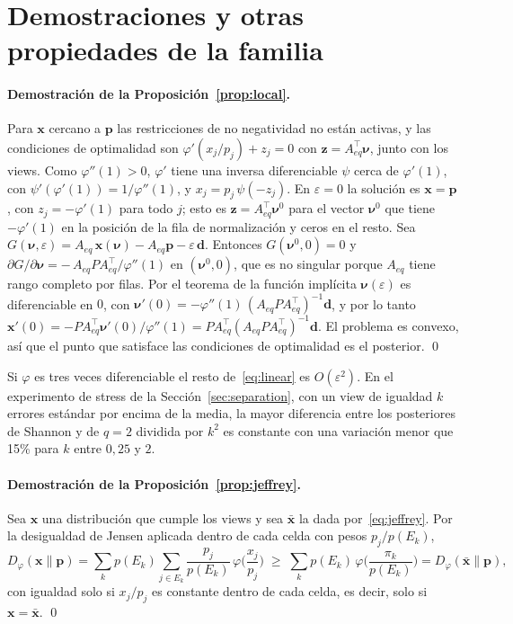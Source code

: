 \documentclass[11pt]{article}
\newcommand{\p}{\mathbf{p}}
\newcommand{\x}{\mathbf{x}}
\begin{document}
\section{Demostraciones y otras propiedades de la familia}\label{app:proofs}

\paragraph{Demostraci\'on de la Proposici\'on~\ref{prop:local}.} Para $\x$
cercano a $\p$ las restricciones de no negatividad no est\'an activas, y las
condiciones de optimalidad son $\varphi'(x_j/p_j) + z_j = 0$ con
$\mathbf{z} = A_{eq}^\top \boldsymbol{\nu}$, junto con los views. Como
$\varphi''(1) > 0$, $\varphi'$ tiene una inversa diferenciable $\psi$ cerca
de $\varphi'(1)$, con $\psi'(\varphi'(1)) = 1/\varphi''(1)$, y
$x_j = p_j\,\psi(-z_j)$. En $\varepsilon = 0$ la soluci\'on es $\x = \p$,
con $z_j = -\varphi'(1)$ para todo $j$; esto es
$\mathbf{z} = A_{eq}^\top \boldsymbol{\nu}^0$ para el vector
$\boldsymbol{\nu}^0$ que tiene $-\varphi'(1)$ en la posici\'on de la fila de
normalizaci\'on y ceros en el resto. Sea
$G(\boldsymbol{\nu}, \varepsilon) = A_{eq}\,\x(\boldsymbol{\nu}) -
A_{eq}\p - \varepsilon\,\mathbf{d}$. Entonces
$G(\boldsymbol{\nu}^0, 0) = 0$ y
$\partial G/\partial \boldsymbol{\nu} = -\,A_{eq} P A_{eq}^\top /
\varphi''(1)$ en $(\boldsymbol{\nu}^0, 0)$, que es no singular porque
$A_{eq}$ tiene rango completo por filas. Por el teorema de la funci\'on
impl\'icita $\boldsymbol{\nu}(\varepsilon)$ es diferenciable en $0$, con
$\boldsymbol{\nu}'(0) = -\varphi''(1)\,(A_{eq} P A_{eq}^\top)^{-1}
\mathbf{d}$, y por lo tanto
$\x'(0) = -P A_{eq}^\top \boldsymbol{\nu}'(0)/\varphi''(1)
= P A_{eq}^\top (A_{eq} P A_{eq}^\top)^{-1}\mathbf{d}$. El problema es
convexo, as\'i que el punto que satisface las condiciones de optimalidad es
el posterior. \qed

Si $\varphi$ es tres veces diferenciable el resto de~\eqref{eq:linear} es
$O(\varepsilon^2)$. En el experimento de stress de la
Secci\'on~\ref{sec:separation}, con un view de igualdad $k$ errores est\'andar
por encima de la media, la mayor diferencia entre los posteriores de
Shannon y de $q=2$ dividida por $k^2$ es constante con una variaci\'on menor
que 15\% para $k$ entre $0{,}25$ y $2$.

\paragraph{Demostraci\'on de la Proposici\'on~\ref{prop:jeffrey}.} Sea $\x$
una distribuci\'on que cumple los views y sea $\bar{\x}$ la dada
por~\eqref{eq:jeffrey}. Por la desigualdad de Jensen aplicada dentro de
cada celda con pesos $p_j/p(E_k)$,
\[
D_\varphi(\x\|\p) = \sum_k p(E_k) \sum_{j \in E_k} \frac{p_j}{p(E_k)}\,
\varphi\!\Big(\frac{x_j}{p_j}\Big)
\;\ge\; \sum_k p(E_k)\, \varphi\!\Big(\frac{\pi_k}{p(E_k)}\Big)
= D_\varphi(\bar{\x}\|\p),
\]
con igualdad solo si $x_j/p_j$ es constante dentro de cada celda, es decir,
solo si $\x = \bar{\x}$. \qed
\end{document}
